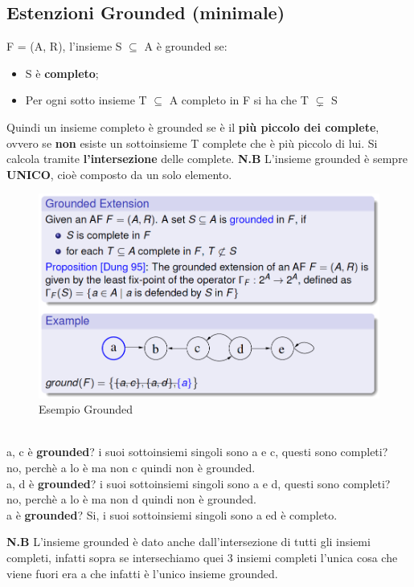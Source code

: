 \subsection{Estenzioni Grounded (minimale)}
F = (A, R), l’insieme S $\subseteq$ A è grounded se:
\begin{itemize}
    \item S è \textbf{completo};
    \item Per ogni sotto insieme T $\subseteq$ A completo in F si ha che T $\subsetneq$ S
\end{itemize}
Quindi un insieme completo è grounded se è il \textbf{più piccolo dei complete}, ovvero se \textbf{non} esiste un sottoinsieme T complete che è più piccolo di lui. Si calcola tramite \textbf{l’intersezione} delle complete.
\textbf{N.B} L’insieme grounded è sempre \textbf{UNICO}, cioè composto da un solo elemento.
\begin{figure}[htp]
	\centering
    \includegraphics[width=12cm, keepaspectratio]{latex/img/Cap6/grounded.png}
    \caption{Esempio Grounded} 
\end{figure}
\\a, c è \textbf{grounded}? i suoi sottoinsiemi singoli sono a e c, questi sono completi?
\\no, perchè a lo è ma non c quindi non è grounded.
\\a, d è \textbf{grounded}? i suoi sottoinsiemi singoli sono a e d, questi sono completi?
\\no, perchè a lo è ma non d quindi non è grounded.
\\a è \textbf{grounded}? Si, i suoi sottoinsiemi singoli sono a ed è completo.

\vspace{0.8cm}

\textbf{N.B} L’insieme grounded è dato anche dall’intersezione di tutti gli insiemi completi, infatti sopra se intersechiamo quei 3 insiemi completi l’unica cosa che viene fuori era a che infatti è l’unico insieme grounded.

